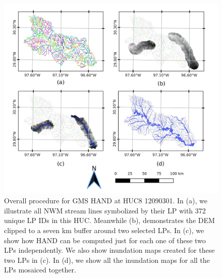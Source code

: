\documentclass[draft]{dependencies/agujournal2019}
\begin{document}
\begin{figure}[H]
\centering
\includegraphics[scale=1.0]{figures/gms_methods.jpg}
\caption{Overall procedure for GMS HAND at HUC8 12090301.
In (a), we illustrate all NWM stream lines symbolized by their LP with 372 unique LP IDs in this HUC.
Meanwhile (b), demonstrates the DEM clipped to a seven km buffer around two selected LPs.
In (c), we show how HAND can be computed just for each one of these two LPs independently. 
We also show inundation maps created for these two LPs in (c). 
In (d), we show all the inundation maps for all the LPs mosaiced together. }
\label{fig:gms_methods}
\end{figure}
%
%
\end{document}

